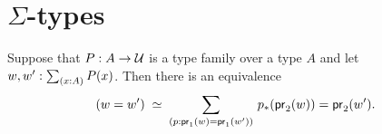 \documentclass[hott-all.tex]{subfiles}
\begin{document}
\section{\texorpdfstring{$\Sigma$}{Σ}-types}
\label{sec:compute-sigma}

%
%
%
%

\begin{thm}\label{thm:path-sigma}
Suppose that $P:A\to\mathcal{U}$ is a type family over a type $A$ and let $w,w':\sm{x:A}P(x)$. Then there is an equivalence
\begin{equation*}
\eqvspaced{(w=w')}{\dsm{p:\proj{1}(w)=\proj{1}(w')} \trans{p}{\proj{2}(w)}=\proj{2}(w')}.
\end{equation*}
\end{thm}
\end{document}
